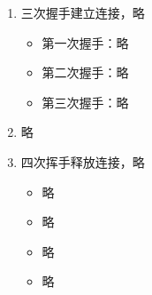 \documentclass{article}
\begin{document}
\begin{enumerate}[(1)]
    \item 三次握手建立连接，略{
    \begin{itemize}
        \item  第一次握手：略
        \item 第二次握手：略
        \item 第三次握手：略
    \end{itemize}
    }
    \item  略
    \item 四次挥手释放连接，略{
    \begin{itemize}
        \item 略
        \item 略
        \item 略
        \item 略
    \end{itemize}
    }
\end{enumerate}
\end{document}
